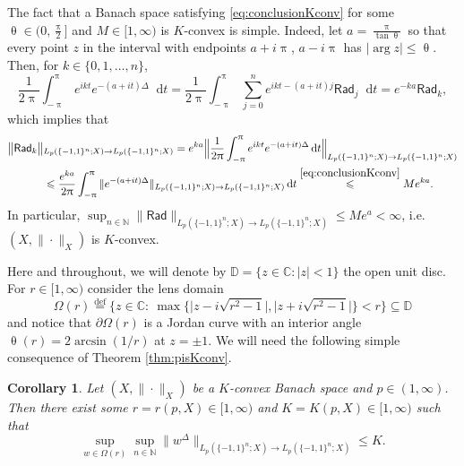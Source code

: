 \documentclass[11pt,reqno]{amsart}
\renewcommand{\leq}{\leqslant}
\renewcommand{\pi}{\uppi}
\newcommand{\1}{\mathbf 1}
\newtheorem{corollary}[theorem]{Corollary}
\theoremstyle{remark}
\newcommand{\C}{\mathbb C}
\newcommand{\N}{\mathbb N}
\newcommand{\eqdef}{\stackrel{\mathrm{def}}{=}}
\renewcommand{\theta}{\uptheta}
\renewcommand{\pi}{\uppi}
\renewcommand{\pi}{\uppi}
\newcommand{\mb}{\mathbb}
\newcommand*\diff{\mathop{}\!\mathrm{d}}
\newcommand{\msf}{\mathsf}
\begin{document}
The fact that a Banach space satisfying \eqref{eq:conclusionKconv} for some $\theta\in\big(0,\frac{\pi}{2}\big]$ and $M\in[1,\infty)$ is $K$-convex is simple. Indeed, let $a = \frac{\pi}{\tan\theta}$ so that every point $z$ in the interval with endpoints $a+i\pi$, $a-i\pi$ has $|\arg z|\leq \theta$. Then, for $k\in\{0,1,\ldots,n\}$,
\begin{equation}
\frac{1}{2\pi}\int_{-\pi}^\pi e^{ikt} e^{-(a+it)\Delta} \diff t = \frac{1}{2\pi} \int_{-\pi}^\pi \sum_{j=0}^n e^{ikt - (a+it)j} \msf{Rad}_j \diff t = e^{-ka} \msf{Rad}_k,
\end{equation}
which implies that
\begin{equation} \label{eq:boundRadk}
\begin{split}
\big\|\msf{Rad}_k\big\|&_{{L_p(\{-1,1\}^n;X)}\to {L_p(\{-1,1\}^n;X)}}  = e^{ka} \Big\|\frac{1}{2\pi} \int_{-\pi}^\pi e^{ikt} e^{-(a+it)\Delta} \diff t\Big\|_{{L_p(\{-1,1\}^n;X)}\to {L_p(\{-1,1\}^n;X)}} 
\\ &\leq \frac{e^{ka}}{2\pi} \int_{-\pi}^\pi \|e^{-(a+it)\Delta}\|_{{L_p(\{-1,1\}^n;X)}\to {L_p(\{-1,1\}^n;X)}} \diff t \stackrel{\eqref{eq:conclusionKconv}}{\leq} M e^{ka}.
\end{split}
\end{equation}
In particular, $\sup_{n\in\N} \|\msf{Rad}\|_{{L_p(\{-1,1\}^n;X)}\to {L_p(\{-1,1\}^n;X)}} \leq Me^a <\infty$, i.e. $(X,\|\cdot\|_X)$ is $K$-convex.

\smallskip

Here and throughout, we will denote by $\mb{D} = \{z\in\C: |z|<1\}$ the open unit disc. For $r\in[1,\infty)$ consider the lens domain 
\begin{equation} \label{eq:Omega(r)def}
\Omega(r) \eqdef \big\{z\in \C: \ \max\big\{\big|z-i\sqrt{r^2-1}\big|, \big|z+i\sqrt{r^2-1}\big|\big\} < r \big\} \subseteq\mb{D} 
\end{equation}
and notice that $\partial\Omega(r)$ is a Jordan curve with an interior angle $\theta(r)=2\arcsin(1/r)$ at $z=\pm1$. We will need the following simple consequence of Theorem \ref{thm:pisKconv}.

\begin{corollary} \label{cor:lens}
Let $(X,\|\cdot\|_X)$ be a $K$-convex Banach space and $p\in(1,\infty)$. Then there exist some $r=r(p,X)\in[1,\infty)$ and $K=K(p,X)\in[1,\infty)$ such that
\begin{equation} \label{eq:LemmaOmega(r)}
\sup_{w\in\Omega(r)} \sup_{n\in\N} \|w^{\Delta}\|_{{L_p(\{-1,1\}^n;X)}\to {L_p(\{-1,1\}^n;X)}} \leq K.
\end{equation}
\end{corollary}
\end{document}
